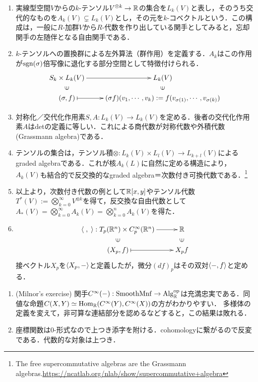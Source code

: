 \documentclass[uplatex,dvipdfmx]{jsreport}
\begin{document}
\begin{notation*}
\begin{enumerate}
        \item 実線型空間$V$からの$k$-テンソル$V^{\otimes k}\to\mathbb{R}$の集合を$L_k(V)$と表し，そのうち交代的なものを$A_k(V)\subsetneq L_k(V)$とし，その元を$k$-コベクトルという．この構成は，一般に$R$-加群$V$から$R$-代数を作り出している関手としてみると，忘却関手の左随伴となる自由関手である．
        \item $k$-テンソルへの置換群による左外算法（群作用）を定義する．$A_k$はこの作用が$\mathrm{sgn}(\sigma)$倍写像に退化する部分空間として特徴付けられる．
        \[\xymatrix@R-2pc{
            S_k\times L_k(V)\ar[r]&L_k(V)\\
            \rotatebox[origin=c]{90}{$\in$}&\rotatebox[origin=c]{90}{$\in$}\\
            (\sigma,f)\ar@{|->}[r]&(\sigma f)(v_1,\cdots,v_k):=f(v_{\sigma(1)},\cdots,v_{\sigma(k)})
        }\]
        \item 対称化／交代化作用素$S,A:L_k(V)\to L_k(V)$を定める．後者の交代化作用素$A$はdetの定義に等しい．これによる商代数が対称代数や外積代数(Grassmann algebra)である．
        \item テンソルの集合は，テンソル積$\otimes:L_k(V)\times L_l(V)\to L_{k+l}(V)$によるgraded algebraである．これが核$A_k(L)$に自然に定める構造により，$A_k(V)$も結合的で反交換的なgraded algebra＝次数付き可換代数である．\footnote{The free supercommutative algebras are the Grassmann algebras.\url{https://ncatlab.org/nlab/show/supercommutative+algebra}}
        \item 以上より，次数付き代数の例として$\mathbb{R}[x,y]$やテンソル代数$T^*(V):=\bigotimes_{k=0}^\infty V^{\otimes k}$を得て，反交換な自由代数として$A_*(V)=\bigotimes_{k=0}^\infty A_k(V)=\bigotimes_{k=0}^n A_k(V)$を得た．
        \item \[\xymatrix@R-2pc{
            \bracket{\;,\;}:T_p(\R^n)\times C_p^\infty(\R^n)\ar[r]&\R\\
            \rotatebox[origin=c]{90}{$\in$}&\rotatebox[origin=c]{90}{$\in$}\\
            (X_p,f)\ar@{|->}[r]&X_pf
        }\]
        接ベクトル$X_p$を$\langle X_p,-\rangle$と定義したが，微分$(df)_p$はその双対$\langle-,f\rangle$と定める．
    \end{enumerate}
\end{notation*}
\begin{remark*}\mbox{}
    \begin{enumerate}
        \item (Milnor's exercise) 関手$C^\infty(-):\mathrm{SmoothMnf}\to\mathrm{Alg}_{\mathbb{R}}^{\mathrm{op}}$は充満忠実である．同値な命題$C(X,Y)\simeq\mathrm{Hom}_{\mathbb{R}}(C^\infty(Y),C^\infty(X))$の方がわかりやすい．
        多様体の定義を変えて，非可算な連結部分を認めるなどすると，この結果は敗れる．
        \item 座標関数は0-形式なので上つき添字を附ける．cohomologyに繋がるので反変である．代数的な対象は上つき．
    \end{enumerate}
\end{remark*}
\end{document}
